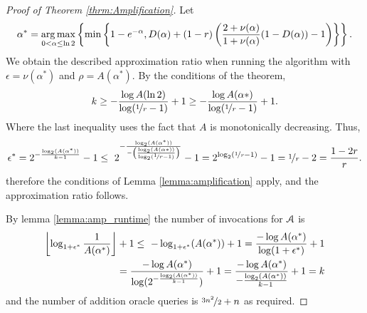 \documentclass[a4paper,UKenglish,cleveref, autoref]{lipics-v2019}
\begin{document}
\begin{proof}[Proof of Theorem \ref{thrm:Amplification}]
	Let $$\alpha^*  = \operatorname*{arg\,max} _{0<\alpha \leq \ln{2}} \left\{ \min \left\{ 1-e^{-\alpha},D(\alpha)+(1-r)\left( \frac{2+\nu(\alpha)}{1+\nu(\alpha)} (1-D(\alpha)) -1\right)\right\}\right\}.$$
	We obtain the described approximation ratio when running the algorithm
	with $\epsilon = \nu(\alpha^*)$ and $\rho = A(\alpha^*)$.
	By the conditions of the theorem,
	$$k \geq -\frac{\log A(\ln 2)} { \log(\nicefrac[]{1}{r} -1 ) } +1 \geq-\frac{\log A(\alpha*)} { \log(\nicefrac[]{1}{r} -1 ) } +1 .$$
	Where the last inequality uses the fact that $A$ is monotonically decreasing.  Thus,
	$$\epsilon^* = 2 ^{-\frac{\log_2 (A(\alpha^*))}{k-1}} -1 \leq \
	2 ^{-\frac{ \log_2(A(\alpha^*))}{  -\left(\frac{\log_2(A(\alpha* ))}{\log_2(\nicefrac[]{1}{r}-1)} \right) }} -1  =
	2^{\log_2(\nicefrac[]{1}{r}-1)} -1 = \nicefrac[]{1}{r}-2 = \frac{1-2r}{r} .$$
	therefore the conditions of Lemma \ref{lemma:amplification} apply,
	and the approximation ratio follows.
	
	By lemma \ref{lemma:amp_runtime} the number of invocations for $\mathcal{A}$
	is
	\begin{align*}
	\left\lfloor \log_{1+\epsilon^*} \frac{1}{A(\alpha^*)} \right\rfloor+1 \leq \
	-\log_{1+\epsilon^*} (A(\alpha^*)) +1 =
	\frac{-\log A(\alpha^*)} {\log(1+\epsilon^*)} +1 \\
	= \frac{-\log {A(\alpha^*)}} {\log(2 ^{-\frac{\log_2 (A(\alpha^*))}{k-1}} )} +1
	= \frac{-\log {A(\alpha^*)}} {-\frac{\log_2 (A(\alpha^*))}{k-1}} +1
	= k \end{align*}
	and the number of addition oracle queries is $\nicefrac[]{3n^2}{2} + n $
	as required.
	
\end{proof}





\appendix
\end{document}

